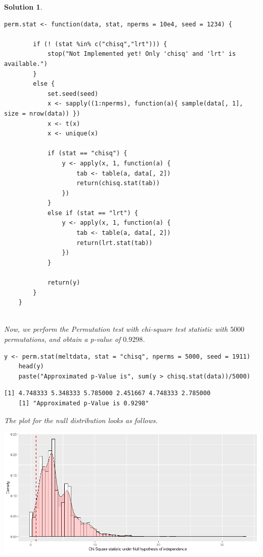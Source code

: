 \documentclass[12pt]{article}
\theoremstyle{problemstyle}
\newtheorem*{solution*}{Solution}
\begin{document}
\begin{solution*}
\begin{lstlisting}[style = R-code]
	perm.stat <- function(data, stat, nperms = 10e4, seed = 1234) {
	
		if (! (stat %in% c("chisq","lrt"))) {
			stop("Not Implemented yet! Only 'chisq' and 'lrt' is available.")
		}
		else {
			set.seed(seed)
			x <- sapply((1:nperms), function(a){ sample(data[, 1], size = nrow(data)) })
			x <- t(x)
			x <- unique(x)
			
			if (stat == "chisq") {
				y <- apply(x, 1, function(a) {
					tab <- table(a, data[, 2])
					return(chisq.stat(tab))
				})
			}
			else if (stat == "lrt") {
				y <- apply(x, 1, function(a) {
					tab <- table(a, data[, 2])
					return(lrt.stat(tab))
				})
			}
			
			return(y)
		}
	}
	
\end{lstlisting} 


Now, we perform the Permutation test with chi-square test statistic with $5000$ permutations, and obtain a p-value of $0.9298$.  

\begin{lstlisting}[style = R-code]
	y <- perm.stat(meltdata, stat = "chisq", nperms = 5000, seed = 1911)
	head(y)
	paste("Approximated p-Value is", sum(y > chisq.stat(data))/5000)
\end{lstlisting}

\begin{lstlisting}[style = R-output]
	[1] 4.748333 5.348333 5.785000 2.451667 4.748333 2.785000
	[1] "Approximated p-Value is 0.9298"
\end{lstlisting}


The plot for the null distribution looks as follows.

\begin{center}
	\includegraphics[width=\linewidth]{chisq.jpeg}
\end{center}



\end{solution*}
\end{document}

